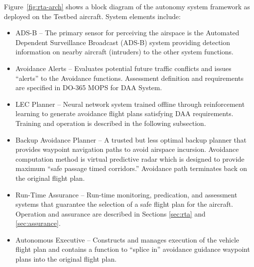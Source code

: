 Figure~\ref{fig:rta-arch} shows a block diagram of the autonomy system framework as deployed on the Testbed aircraft.
System elements include: 
\begin{itemize}
\item ADS-B – The primary sensor for perceiving the airspace is the Automated Dependent Surveillance Broadcast (ADS-B) system providing detection information on  nearby aircraft (intruders) to the other system functions.
\item Avoidance Alerts – Evaluates potential future traffic conflicts and issues “alerts” to the Avoidance functions.  Assessment definition and requirements are specified in DO-365 MOPS for DAA System.
\item LEC Planner -- Neural network system trained offline through reinforcement learning to generate avoidance flight plans satisfying DAA requirements.  Training and operation is described in the following subsection.  
\item Backup Avoidance Planner – A trusted but less optimal backup planner that provides waypoint navigation paths to avoid airspace incursion.  Avoidance computation method is virtual predictive radar which is designed to provide maximum ``safe passage timed corridors.''  Avoidance path terminates back on the original flight plan.
\item Run-Time Assurance  – Run-time monitoring, predication, and assessment systems that guarantee the selection of a safe flight plan for the aircraft.  Operation and assurance are described in Sections \ref{sec:rta} and \ref{sec:assurance}.
\item Autonomous Executive – Constructs and manages execution of the vehicle flight plan and contains a function to ``splice in'' avoidance guidance waypoint plans into the original flight plan.
\end{itemize}

